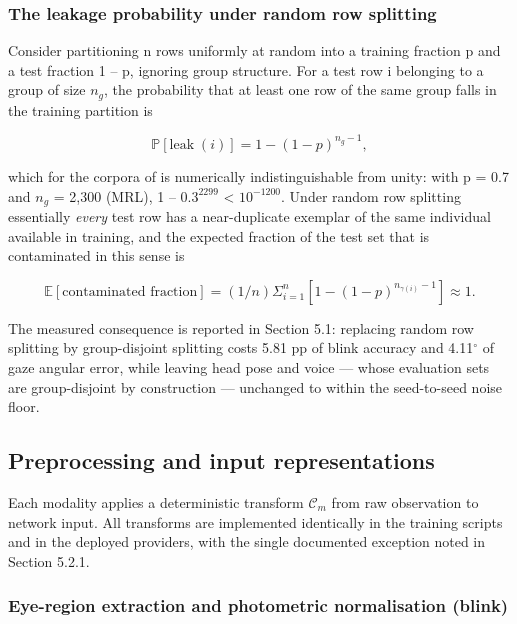 \subsubsection{The leakage probability under random row splitting}

Consider partitioning n rows uniformly at random into a training fraction p and a test fraction 1 -- p, ignoring group structure. For a test row i belonging to a group of size $n_{g}$, the probability that at least one row of the same group falls in the training partition is

\begin{equation}
\label{eq:11}
\mathbb{P}[ \text{leak}\;(i) ] = 1 - (1 - p)^{n_g - 1} ,
\end{equation}

which for the corpora of  is numerically indistinguishable from unity: with p = 0.7 and $n_{g}$ = 2,300 (MRL), 1 -- $0.3^{2299}$ < $10^{-1200}$. Under random row splitting essentially \emph{every} test row has a near-duplicate exemplar of the same individual available in training, and the expected fraction of the test set that is contaminated in this sense is

\begin{equation}
\label{eq:12}
\mathbb{E}[ \text{contaminated fraction} ] = (1/n) \Sigma _{i=1}^{n} [ 1 - (1 - p)^{n_{\gamma (i)} - 1} ] \approx 1.
\end{equation}

The measured consequence is reported in Section 5.1: replacing random row splitting by group-disjoint splitting costs 5.81 pp of blink accuracy and 4.11$^{\circ}$ of gaze angular error, while leaving head pose and voice --- whose evaluation sets are group-disjoint by construction --- unchanged to within the seed-to-seed noise floor.

\FloatBarrier

\subsection{Preprocessing and input representations}

Each modality applies a deterministic transform $\mathcal{C}_{m}$ from raw observation to network input. All transforms are implemented identically in the training scripts and in the deployed providers, with the single documented exception noted in Section 5.2.1.

\subsubsection{Eye-region extraction and photometric normalisation (blink)}

